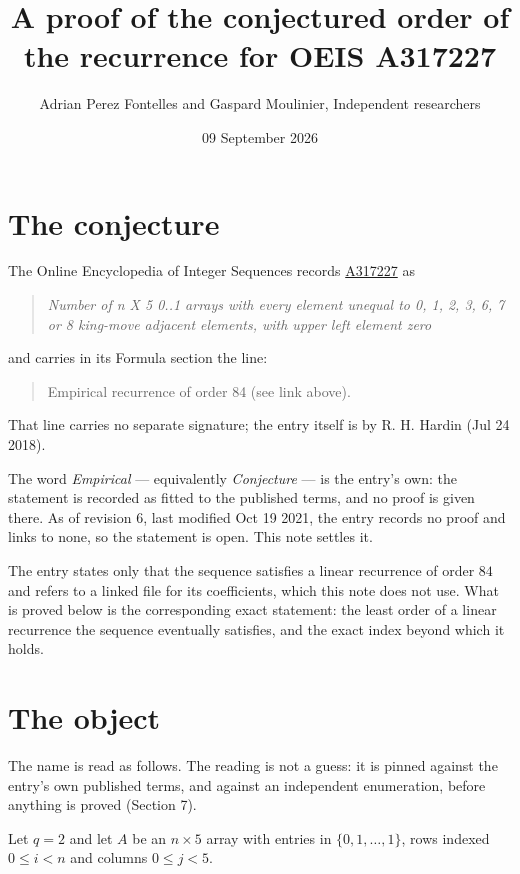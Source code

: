 \documentclass[11pt]{article}
\title{A proof of the conjectured order of the recurrence for OEIS A317227}
\author{Adrian Perez Fontelles and Gaspard Moulinier, Independent researchers}
\date{09 September 2026}
\theoremstyle{definition}
\begin{document}
\maketitle
\section{The conjecture}

The Online Encyclopedia of Integer Sequences records \href{https://oeis.org/A317227}{A317227} as

\begin{quote}\itshape Number of n X 5 0..1 arrays with every element unequal to 0, 1, 2, 3, 6, 7 or 8 king-move adjacent elements, with upper left element zero\end{quote}

and carries in its Formula section the line:

\begin{quote}\ttfamily Empirical recurrence of order 84 (see link above).\end{quote}

That line carries no separate signature; the entry itself is by R. H. Hardin (Jul 24 2018).

The word {\itshape Empirical} --- equivalently {\itshape Conjecture} --- is the entry's own: the statement is recorded as fitted to the published terms, and no proof is given there. As of revision 6, last modified Oct 19 2021, the entry records no proof and links to none, so the statement is open. This note settles it.

The entry states only that the sequence satisfies a linear recurrence of order $84$ and refers to a linked file for its coefficients, which this note does not use. What is proved below is the corresponding exact statement: the least order of a linear recurrence the sequence eventually satisfies, and the exact index beyond which it holds.

\section{The object}

The name is read as follows. The reading is not a guess: it is pinned against the entry's own published terms, and against an independent enumeration, before anything is proved (Section 7).

Let $q = 2$ and let $A$ be an $n \times 5$ array with entries in $\{0,1,\dots,1\}$, rows indexed $0 \le i < n$ and columns $0 \le j < 5$.
\end{document}
